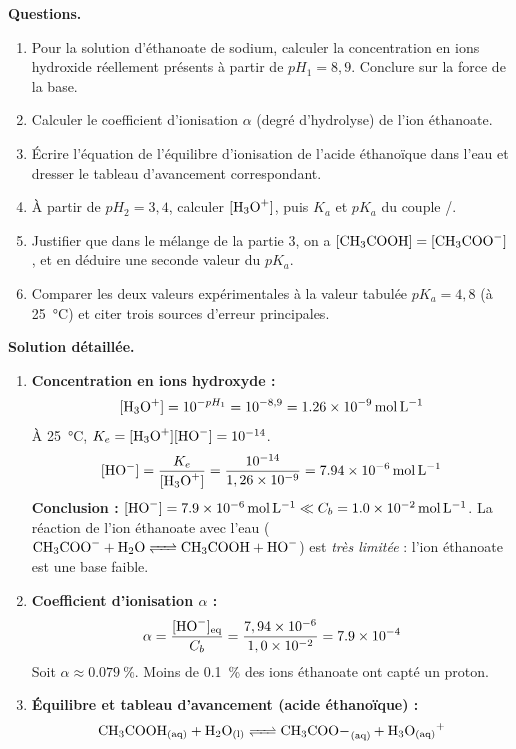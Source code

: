 \documentclass[11pt]{article}
\newcommand{\cle}[1]{{\popxbold\color{popdark}#1}}
\newcounter{popsec}
\newcounter{popsub}
\newcommand{\courssub}[1]{%
  \stepcounter{popsub}%
  \par\vspace{9pt}\noindent{\popxbold\fontsize{11.5}{13}\selectfont\color{popink}{\color{poporange}\thepopsec.\thepopsub}\hspace{6pt}#1}\par\nopagebreak\vspace{4pt}
}
\begin{document}
\courssub{Exploitation}

\begin{exoresolu}
\textbf{Questions.}
\begin{enumerate}
\item Pour la solution d'éthanoate de sodium, calculer la concentration en ions hydroxide réellement présents à partir de $pH_1 = 8,9$. Conclure sur la force de la base.
\item Calculer le coefficient d'ionisation $\alpha$ (degré d'hydrolyse) de l'ion éthanoate.
\item Écrire l'équation de l'équilibre d'ionisation de l'acide éthanoïque dans l'eau et dresser le tableau d'avancement correspondant.
\item À partir de $pH_2 = 3,4$, calculer $[\ce{H3O+}]$, puis $K_a$ et $pK_a$ du couple /.
\item Justifier que dans le mélange de la partie 3, on a $[\ce{CH3COOH}] = [\ce{CH3COO-}]$, et en déduire une seconde valeur du $pK_a$.
\item Comparer les deux valeurs expérimentales à la valeur tabulée $pK_a = 4,8$ (à \SI{25}{\celsius}) et citer trois sources d'erreur principales.
\end{enumerate}
\tcblower
\textbf{Solution détaillée.}
\begin{enumerate}
\item \textbf{Concentration en ions hydroxyde :}
\[ [\ce{H3O+}] = 10^{-pH_1} = 10^{-8,9} = \SI{1,26e-9}{mol.L^{-1}} \]
À \SI{25}{\celsius}, $K_e = [\ce{H3O+}][\ce{HO-}] = 10^{-14}$.
\[ [\ce{HO-}] = \frac{K_e}{[\ce{H3O+}]} = \frac{10^{-14}}{1,26 \times 10^{-9}} = \SI{7,94e-6}{mol.L^{-1}} \]
\textbf{Conclusion :} $[\ce{HO-}] = \SI{7,9e-6}{mol.L^{-1}} \ll C_b = \SI{1,0e-2}{mol.L^{-1}}$. La réaction de l'ion éthanoate avec l'eau ($\ce{CH3COO- + H2O <=> CH3COOH + HO-}$) est \emph{très limitée} : l'ion éthanoate est une \cle{base faible}.
\item \textbf{Coefficient d'ionisation $\alpha$ :}
\[ \alpha = \frac{[\ce{HO-}]_{\text{eq}}}{C_b} = \frac{7,94 \times 10^{-6}}{1,0 \times 10^{-2}} = \SI{7,9e-4}{} \]
Soit $\alpha \approx \SI{0,079}{\percent}$. Moins de \SI{0,1}{\percent} des ions éthanoate ont capté un proton.
\item \textbf{Équilibre et tableau d'avancement (acide éthanoïque) :}
\[ \ce{CH3COOH_{(aq)} + H2O_{(l)} <=> CH3COO-_{(aq)} + H3O+_{(aq)}} \]
\begin{center}
\begin{tabular}{lcccc}

\end{tabular}
\end{center}
\end{enumerate}
\end{exoresolu}
\end{document}

